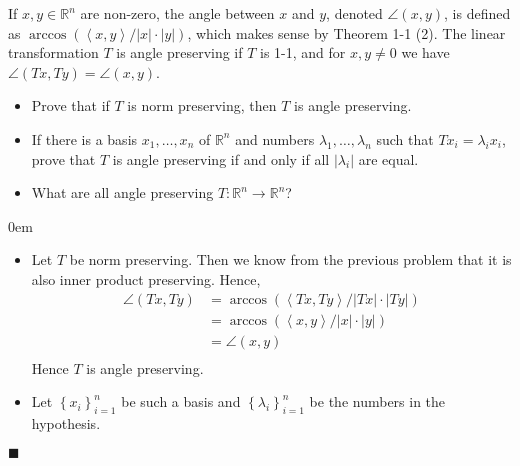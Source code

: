 \documentclass[12pt]{article}
\renewcommand{\qed}{\hfill$\blacksquare$}
\renewenvironment{proof}{\begin{addmargin}[1em]{0em}\begin{newproof}}{\end{newproof}\end{addmargin}\qed}
\newenvironment{problem}[2][Problem]{\begin{trivlist}
\item[\hskip \labelsep {\bfseries #1}\hskip \labelsep {\bfseries #2.}]}{\end{trivlist}}
\begin{document}
\begin{problem}{1.8}
If $x,y \in \mathbb{R}^n$ are non-zero, the angle between $x$ and $y$, denoted $\angle\left(x,y\right)$, is defined as $\arccos \left( \left\langle x,y\right\rangle / \left|x\right| \cdot \left|y\right| \right)$, which makes sense by Theorem 1-1 (2). The linear transformation $T$ is angle preserving if $T$ is 1-1, and for $x,y \neq 0$ we have $\angle \left(Tx,Ty\right) = \angle\left(x,y\right)$.
\begin{itemize}
	\item Prove that if $T$ is norm preserving, then $T$ is angle preserving. \\
	\item If there is a basis $x_1,\ldots,x_n$ of $\mathbb{R}^n$ and numbers $\lambda_1,\ldots, \lambda_n$ such that $Tx_i = \lambda_ix_i$, prove that $T$ is angle preserving if and only if all $\left| \lambda_i \right|$ are equal. \\
	\item What are all angle preserving $T:\mathbb{R}^n \rightarrow \mathbb{R}^n$?
\end{itemize}
\end{problem}

\begin{proof}

\begin{itemize}
	\item Let $T$ be norm preserving. Then we know from the previous problem that it is also inner product preserving. Hence,
	\begin{equation*}
	\begin{split}
	\angle \left( Tx,Ty\right) & = \arccos \left( \left\langle Tx,Ty \right\rangle / \left|Tx\right| \cdot \left| Ty \right| \right) \\ 
	& = \arccos \left( \left\langle x, y\right\rangle / \left|x\right| \cdot \left| y\right| \right) \\
	& = \angle \left(x,y\right) \\
	\end{split}
	\end{equation*}
Hence $T$ is angle preserving. \\
	\item Let $\left\{ x_i \right\}_{i=1}^n$ be such a basis and $\left\{ \lambda_i \right\}_{i=1}^n$ be the numbers in the hypothesis. 
\end{itemize}

\end{proof}
\end{document}
